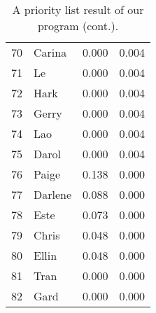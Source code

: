 \documentclass{icmmcm}
\begin{document}
\begin{table}[h!]
\begin{center}
\begin{tabular}{|@{}r@{}||l|c|@{}c@{}|}
70   	&Carina       	& 0.000	&    0.004\\
71   	&Le           	& 0.000	&    0.004\\
72   	&Hark         	& 0.000	&    0.004\\
73   	&Gerry        	& 0.000	&    0.004\\
74   	&Lao          	& 0.000	&    0.004\\
75   	&Darol        	& 0.000	&    0.004\\
76   	&Paige        	& 0.138	&    0.000\\
77   	&Darlene      	& 0.088	&    0.000\\
78   	&Este         	& 0.073	&    0.000\\
79   	&Chris        	& 0.048	&    0.000\\
80   	&Ellin        	& 0.048	&    0.000\\
81   	&Tran         	& 0.000	&    0.000\\
82   	&Gard         	& 0.000	&    0.000\\
\hline
 \bottomrule	
    \end{tabular}
  \end{center}
  \caption[A Result of the Priority List (cont.)]
  {A priority list result of our program (cont.).}
  \label{tab:priority2}
\end{table}
\onecolumn
\end{document}
